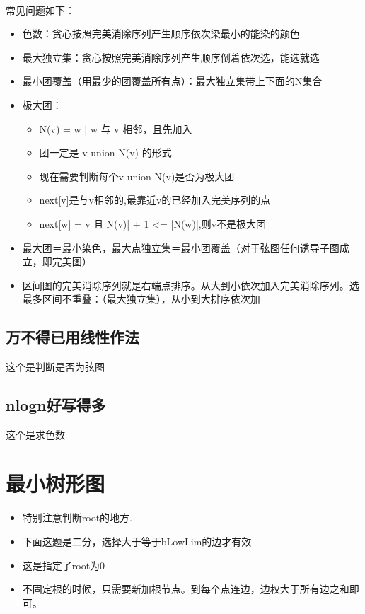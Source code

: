 \documentclass[landscape]{report}
\newcommand{\includecode}[2][c]{}
\begin{document}
\begin{flushleft}
\begin{multicols}{2}
\paragraph{ }
常见问题如下：
\begin{itemize}
\item  色数：贪心按照完美消除序列产生顺序依次染最小的能染的颜色
\item 最大独立集：贪心按照完美消除序列产生顺序倒着依次选，能选就选
 \item 最小团覆盖（用最少的团覆盖所有点）：最大独立集带上下面的N集合
  \item 极大团：
  		\begin{itemize}
  		
    	\item N(v) = {w | w 与 v 相邻，且先加入}
       \item 团一定是 v union N(v) 的形式
      \item 现在需要判断每个v union N(v)是否为极大团
     \item next[v]是与v相邻的,最靠近v的已经加入完美序列的点
     \item next[w] = v 且|N(v)| + 1 <= |N(w)|,则v不是极大团
    
  		\end{itemize}
  \item  最大团＝最小染色，最大点独立集＝最小团覆盖（对于弦图任何诱导子图成立，即完美图）
  \item 区间图的完美消除序列就是右端点排序。从大到小依次加入完美消除序列。选最多区间不重叠：（最大独立集），从小到大排序依次加
\end{itemize}

\subsection{ 万不得已用线性作法}
这个是判断是否为弦图
\includecode[c++]{zoj1015.cpp}
\subsection{ nlogn好写得多}
这个是求色数
\includecode[c++]{hnoi2008.cpp}

\section{最小树形图}
\paragraph{ }
\begin{itemize}
\item  特别注意判断root的地方.
\item 下面这题是二分，选择大于等于bLowLim的边才有效
\item 这是指定了root为0
\item 不固定根的时候，只需要新加根节点。到每个点连边，边权大于所有边之和即可。
\end{itemize}
\includecode[c++]{uva11865.cpp}

\end{multicols}
\end{flushleft}
\end{document}
